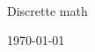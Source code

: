 \thispagestyle{empty}

~

\vspace{200pt}

\begin{center}
    {\Huge Discrette math}\par
	\vspace{10pt}
    \today
\end{center}

\newpage

